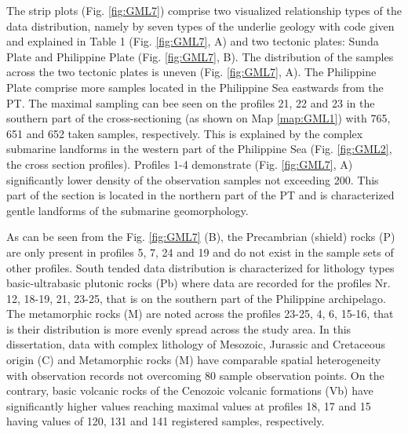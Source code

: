 \documentclass[11pt,a4paper]{report}
\begin{document}
{The strip plots (Fig. \ref{fig:GML7}) comprise two visualized relationship types of the data distribution, namely by seven types of the underlie geology with code given and explained in Table 1 (Fig. \ref{fig:GML7}, A) and two tectonic plates: Sunda Plate  and Philippine Plate (Fig. \ref{fig:GML7}, B). The distribution of the samples across the two tectonic plates is uneven (Fig. \ref{fig:GML7}, A). The Philippine Plate comprise more samples located in the Philippine Sea  eastwards from the \ac{PT}. The maximal sampling can bee seen on the profiles 21, 22 and 23 in the southern part of the cross-sectioning (as shown on Map \ref{map:GML1}) with 765, 651 and 652 taken samples, respectively. This is explained by the complex submarine landforms in the western part of the Philippine Sea (Fig. \ref{fig:GML2}, the cross section profiles). Profiles 1-4 demonstrate (Fig. \ref{fig:GML7}, A) significantly lower density of the observation samples not exceeding 200. This part of the section is located in the northern part of the \ac{PT} and is characterized gentle landforms of the submarine geomorphology. 

As can be seen from the Fig. \ref{fig:GML7} (B), the Precambrian (shield) rocks (P) are only present in profiles 5, 7, 24 and 19 and do not exist in the sample sets of other profiles. South tended data distribution is characterized for lithology types basic-ultrabasic plutonic rocks (Pb) where data are recorded for the profiles Nr. 12, 18-19, 21, 23-25, that is on the southern part of the Philippine archipelago. The metamorphic rocks (M) are noted across the profiles 23-25, 4, 6, 15-16, that is their distribution is more evenly spread across the study area. In this dissertation, data with complex lithology of Mesozoic, Jurassic and Cretaceous origin (C) and Metamorphic rocks (M) have comparable spatial heterogeneity with observation records not overcoming 80 sample observation points. On the contrary, basic volcanic rocks of the Cenozoic volcanic formations (Vb) have significantly higher values reaching maximal values at profiles 18, 17 and 15 having values of 120, 131 and 141 registered samples, respectively. 

}
\end{document}

